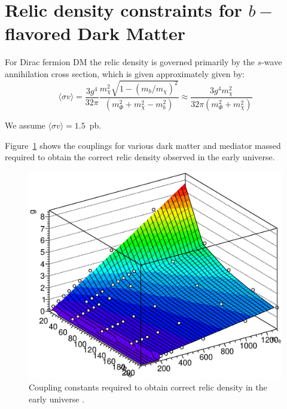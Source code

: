 \section{\texorpdfstring{Relic density constraints for $b-$flavored Dark Matter}{Relic density constraints for b-flavored Dark Matter}}
\label{app:Relic_Density_bFDM}
\label{app:xsecs_bFDM}

For Dirac fermion DM the relic density is governed primarily by the $s$-wave annihilation cross section, which is given approximately given by:
\begin{equation}
\langle \sigma v \rangle = \frac{3g^4}{32\pi} \frac{m^2_\chi \sqrt{1-(m_b/m_\chi)^2}}{\left( m^2_\Phi+m^2_\chi-m^2_b \right)} \approx \frac{3g^4 m^2_\chi}{32\pi (m^2_\Phi+m^2_\chi)}
\end{equation}

We assume $ \langle \sigma v \rangle=1.5$~pb. 


Figure~\ref{fig:relic_weights} shows the couplings for various dark matter and mediator massed required to obtain the correct relic density observed in the early universe.

\begin{figure}[h!]
	\centering 
	\includegraphics[scale=0.5]{figures/bFDM/relic_weights.eps}
	\caption{Coupling constants required to obtain correct relic density in the early universe . \label{fig:relic_weights}}
	\end{figure}	

